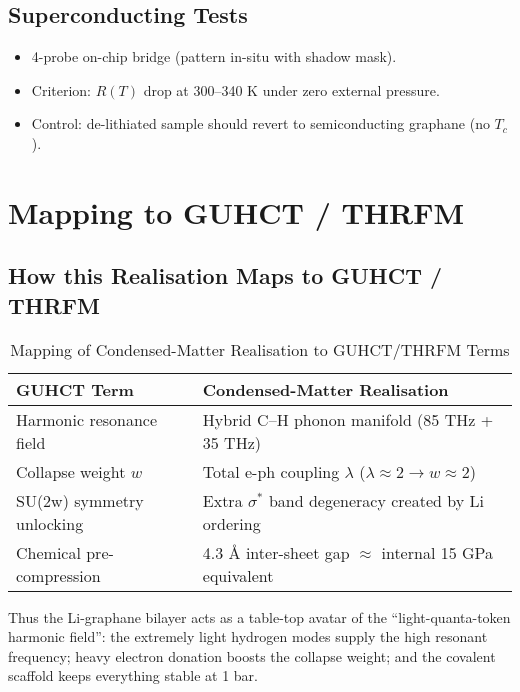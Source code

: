 \documentclass[11pt,a4paper]{article}
\begin{document}
\subsection{Superconducting Tests}
\label{subsec:superconducting_tests}
\begin{itemize}
\item 4-probe on-chip bridge (pattern in-situ with shadow mask).
\item Criterion: 
$R(T)$ drop at 300–340 K under zero external pressure.
\item Control: de-lithiated sample should revert to semiconducting graphane (no 
$T_c$).
\end{itemize}

\section{Mapping to GUHCT / THRFM}
\label{sec:mapping_guhct_thrfm_realisation}

\subsection{How this Realisation Maps to GUHCT / THRFM}
\label{subsec:how_realisation_maps}
\begin{table}[htbp]
\centering
\caption{Mapping of Condensed-Matter Realisation to GUHCT/THRFM Terms}
\label{tab:guhct_mapping_realisation}
\begin{tabularx}{\textwidth}{X X}
\toprule
\textbf{GUHCT Term} & \textbf{Condensed-Matter Realisation} \\
\midrule
Harmonic resonance field & Hybrid C–H phonon manifold (85 THz + 35 THz) \\
Collapse weight 
$w$ & Total e-ph coupling 
$\lambda$ ($\lambda \approx 2 \rightarrow w \approx 2$) \\
SU(2w) symmetry unlocking & Extra 
$\sigma^*$ band degeneracy created by Li ordering \\
Chemical pre-compression & 4.3 Å inter-sheet gap 
$\approx$ internal 15 GPa equivalent \\
\bottomrule
\end{tabularx}
\end{table}
Thus the Li-graphane bilayer acts as a table-top avatar of the “light-quanta-token harmonic field”: the extremely light hydrogen modes supply the high resonant frequency; heavy electron donation boosts the collapse weight; and the covalent scaffold keeps everything stable at 1 bar.
\end{document}
